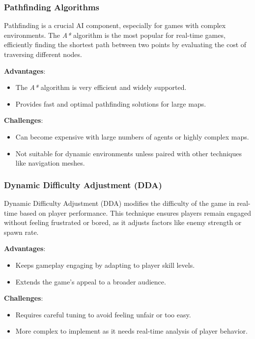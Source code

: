 \documentclass{article} %
\begin{document}
\subsubsection{Pathfinding Algorithms}

Pathfinding is a crucial AI component, especially for games with complex environments. The \textit{A*} algorithm is the most popular for real-time games, efficiently finding the shortest path between two points by evaluating the cost of traversing different nodes.

\textbf{Advantages}:
\begin{itemize}
	\item The \textit{A*} algorithm is very efficient and widely supported.
	\item Provides fast and optimal pathfinding solutions for large maps.
\end{itemize}

\textbf{Challenges}:
\begin{itemize}
	\item Can become expensive with large numbers of agents or highly complex maps.
	\item Not suitable for dynamic environments unless paired with other techniques like navigation meshes.
\end{itemize}

\subsubsection{Dynamic Difficulty Adjustment (DDA)}

Dynamic Difficulty Adjustment (DDA) modifies the difficulty of the game in real-time based on player performance. This technique ensures players remain engaged without feeling frustrated or bored, as it adjusts factors like enemy strength or spawn rate.

\textbf{Advantages}:
\begin{itemize}
	\item Keeps gameplay engaging by adapting to player skill levels.
	\item Extends the game's appeal to a broader audience.
\end{itemize}

\textbf{Challenges}:
\begin{itemize}
	\item Requires careful tuning to avoid feeling unfair or too easy.
	\item More complex to implement as it needs real-time analysis of player behavior.
\end{itemize}
\end{document}
